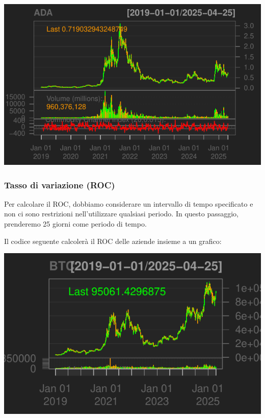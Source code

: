 \documentclass[]{tufte-handout}
\newenvironment{Shaded}{}{}
\newcommand{\AttributeTok}[1]{\textcolor[rgb]{0.49,0.56,0.16}{#1}}
\newcommand{\CommentTok}[1]{\textcolor[rgb]{0.38,0.63,0.69}{\textit{#1}}}
\newcommand{\DecValTok}[1]{\textcolor[rgb]{0.25,0.63,0.44}{#1}}
\newcommand{\FunctionTok}[1]{\textcolor[rgb]{0.02,0.16,0.49}{#1}}
\newcommand{\NormalTok}[1]{#1}
\newcommand{\OtherTok}[1]{\textcolor[rgb]{0.00,0.44,0.13}{#1}}
\newcommand{\SpecialCharTok}[1]{\textcolor[rgb]{0.25,0.44,0.63}{#1}}
\newcommand{\StringTok}[1]{\textcolor[rgb]{0.25,0.44,0.63}{#1}}
\begin{document}
\includegraphics{cripto_update_files/figure-latex/unnamed-chunk-11-10}

\hypertarget{tasso-di-variazione-roc}{%
\subsubsection{Tasso di variazione
(ROC)}\label{tasso-di-variazione-roc}}

Per calcolare il ROC, dobbiamo considerare un intervallo di tempo
specificato e non ci sono restrizioni nell'utilizzare qualsiasi periodo.
In questo passaggio, prenderemo 25 giorni come periodo di tempo.

Il codice seguente calcolerà il ROC delle aziende insieme a un grafico:

\begin{Shaded}
\end{Shaded}

\includegraphics{cripto_update_files/figure-latex/unnamed-chunk-12-1}
\end{document}
